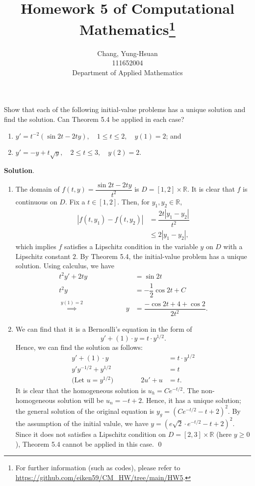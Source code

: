 \documentclass[11pt]{article}
\title{Homework 5 of Computational Mathematics\thanks{For further information (such as codes), please refer to \url{https://github.com/eiken59/CM_HW/tree/main/HW5}.}}
\author{Chang, Yung-Hsuan\\111652004\\Department of Applied Mathematics}
\theoremstyle{break}
\numberwithin{equation}{theorem}
\begin{document}
\maketitle
\thispagestyle{empty}
\newpage
{}

\begin{problem}\label{problem 1} %
    Show that each of the following initial-value problems has a unique solution and find the solution. Can Theorem 5.4 be applied in each case?
    \begin{enumerate}
        \item $y'=t^{-2}(\sin2t-2ty), \quad 1\leq t\leq 2, \quad y(1)=2$; and
        \item $y'=-y+t\sqrt{y}, \quad 2\leq t\leq 3, \quad y(2)=2$.
    \end{enumerate}
\end{problem}
\textbf{Solution}. 
\begin{enumerate}
    \item The domain of $f(t, y)=\dfrac{\sin 2t-2ty}{t^2}$ is $D=[1, 2]\times\mathbb{R}$. It is clear that $f$ is continuous on $D$. Fix a $t\in[1, 2]$. Then, for $y_1, y_2\in\mathbb{R}$, \begin{align*}
        |f(t, y_1)-f(t, y_2)|&=\dfrac{2t|y_1-y_2|}{t^2}\\
        &\leq2|y_1-y_2|,
    \end{align*}
    which implies $f$ satisfies a Lipschitz condition in the variable $y$ on $D$ with a Lipschitz constant $2$. By Theorem 5.4, the initial-value problem has a unique solution. Using calculus, we have \begin{align*}
        t^2y'+2ty&=\sin 2t\\
        t^2y&=-\dfrac{1}{2}\cos2t+C\\
        \overset{y(1)=2}{\implies}\qquad\qquad\quad\quad y&=\dfrac{-\cos2t+4+\cos2}{2t^2}.
    \end{align*}
    \item We can find that it is a Bernoulli's equation in the form of \begin{equation*}
        y'+(1)\cdot y=t\cdot y^{1/2}.
    \end{equation*}
    Hence, we can find the solution as follows:
    \begin{align*}
        y'+(1)\cdot y&=t\cdot y^{1/2}\\
        y'y^{-1/2}+y^{1/2}&=t\\
        \text{(Let $u=y^{1/2}$)}\qquad\qquad2u'+u&=t.
    \end{align*}
    It is clear that the homogeneous solution is $u_h=Ce^{-t/2}$. The non-homogeneous solution will be $u_n=-t+2$. Hence, it has a unique solution; the general solution of the original equation is $y_g=(Ce^{-t/2}-t+2)^2$. By the assumption of the initial valule, we have $y=\left(e\sqrt{2}\cdot e^{-t/2}-t+2\right)^2$. Since it does not satisfies a Lipschitz condition on $D=[2, 3]\times\mathbb{R}$ (here $y\geq0$), Theorem 5.4 cannot be applied in this case. \qed
\end{enumerate}
\end{document}
